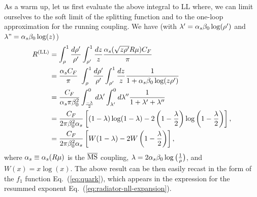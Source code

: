 As a warm up, let us first evaluate the above integral to LL where, we
can limit ourselves to the soft limit of the splitting function and to
the one-loop approximation for the running coupling. We have (with
$\lambda'=\alpha_s \beta_0\log(\rho')$ and $\lambda"=\alpha_s \beta_0\log(z)$)
\begin{align}\label{app:analytic-LL}
R^{\text{(LL)}} & = \int_\rho^1 \frac{d \rho'}{\rho'} \int_{\rho'}^1 \frac{d
                  z}{z}\frac{\alpha_s( \sqrt{z \rho'} R\mu)C_F}{\pi}  \\
  &=
\frac{ \alpha_s C_F}{\pi} \ \int_\rho^1 \frac{d \rho'}{\rho'}
    \int_{\rho'}^1 \frac{d z}{z} \frac{1}{1+ \alpha_s \beta_0 \log ( z
    \rho')}  \nonumber \\
& =\frac{C_F}{\alpha_s \pi \beta_0^2}  \int_\frac{-\lambda}{2}^0 d \lambda'
    \int_{\lambda'}^0 d \lambda'' \frac{1}{1+\lambda'+\lambda'' } \nonumber\\
&= \frac{C_F}{2 \pi \beta_0^2 \alpha_s} \left[(1- \lambda) \log(1-\lambda)-2\left (1-\frac{\lambda}{2}\right) \log \left(1-\frac{\lambda}{2}  \right)\right],\nonumber\\
&= \frac{C_F}{2 \pi \beta_0^2 \alpha_s} \left[W(1- \lambda)-2W\left (1-\frac{\lambda}{2}\right)\right],\nonumber
\end{align}
where $\alpha_s\equiv\alpha_s(R\mu)$ is the $\overline{\rm MS}$ coupling,
$\lambda=2 \alpha_s \beta_0 \log \big(\frac{1}{\rho}\big)$, and $W(x)=x\log(x)$. The
above result can be then easily recast in the form of the $f_1$
function Eq.~(\ref{eq:quark}), which appears in the expression for the
resummed exponent Eq.~(\ref{eq:radiator-nll-expansion}).

